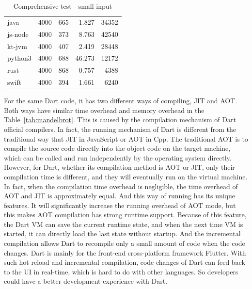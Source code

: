 \begin{table}[htbp]
\begin{subtable}[h]{0.495\linewidth}
\begin{tabular}{lrrrr}
            java      & 4000 & 665     & 1.827  & 34352   \\
            js-node   & 4000 & 373     & 8.763  & 42540   \\
            kt-jvm    & 4000 & 407     & 2.419  & 28448   \\
            python3   & 4000 & 688     & 46.273 & 12172   \\
            rust      & 4000 & 868     & 0.757  & 4388    \\
            swift     & 4000 & 394     & 1.661  & 6240    \\
            \bottomrule
        \end{tabular}
        \caption{Comprehensive test - small input}
        \label{tab:mandelbrot-2}
    \end{subtable}
\end{table}

For the same Dart code, it has two different ways of compiling, JIT and AOT\@.
Both ways have similar time overhead and memory overhead in the Table~\ref{tab:mandelbrot}.
This is caused by the compilation mechanism of Dart official compilers.
In fact, the running mechanism of Dart is different from the traditional way that JIT in JavaScript or AOT in Cpp.
The traditional AOT is to compile the source code directly into the object code on the target machine,
which can be called and run independently by the operating system directly.
However, for Dart, whether its compilation method is AOT or JIT, only their compilation time is different,
and they will eventually run on the virtual machine.
In fact, when the compilation time overhead is negligible, the time overhead of AOT and JIT is approximately equal.
And this way of running has its unique features.
It will significantly increase the running overhead of AOT mode, but this makes AOT compilation has strong runtime support.
Because of this feature, the Dart VM can save the current runtime state, and when the next time VM is started,
it can directly load the last state without startup.
And the incremental compilation allows Dart to recompile only a small amount of code when the code changes.
Dart is mainly for the front-end cross-platform framework Flutter.
With such hot reload and incremental compilation, code changes of Dart can feed back to the UI in real-time,
which is hard to do with other languages.
So developers could have a better development experience with Dart.

